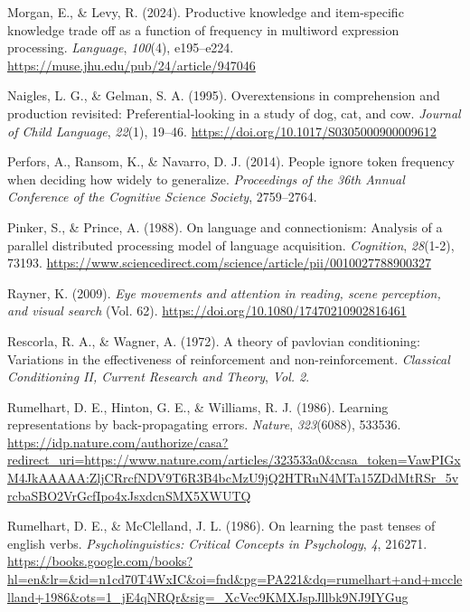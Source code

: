 \documentclass[
  letterpaper,
  DIV=11,
  numbers=noendperiod]{scrartcl}
\newlength{\cslhangindent}
\newenvironment{CSLReferences}[2] %
 {\begin{list}{}{%
  \setlength{\itemindent}{0pt}
  \setlength{\leftmargin}{0pt}
  \setlength{\parsep}{0pt}
  \ifodd #1
   \setlength{\leftmargin}{\cslhangindent}
   \setlength{\itemindent}{-1\cslhangindent}
  \fi
  \setlength{\itemsep}{#2\baselineskip}}}
 {\end{list}}
\begin{document}
\begin{CSLReferences}{1}{0}
Morgan, E., \& Levy, R. (2024). Productive knowledge and item-specific
knowledge trade off as a function of frequency in multiword expression
processing. \emph{Language}, \emph{100}(4), e195--e224.
\url{https://muse.jhu.edu/pub/24/article/947046}

Naigles, L. G., \& Gelman, S. A. (1995). Overextensions in comprehension
and production revisited: Preferential-looking in a study of dog, cat,
and cow. \emph{Journal of Child Language}, \emph{22}(1), 19--46.
\url{https://doi.org/10.1017/S0305000900009612}

Perfors, A., Ransom, K., \& Navarro, D. J. (2014). People ignore token
frequency when deciding how widely to generalize. \emph{Proceedings of
the 36th Annual Conference of the Cognitive Science Society},
2759--2764.

Pinker, S., \& Prince, A. (1988). On language and connectionism:
Analysis of a parallel distributed processing model of language
acquisition. \emph{Cognition}, \emph{28}(1-2), 73193.
\url{https://www.sciencedirect.com/science/article/pii/0010027788900327}

Rayner, K. (2009). \emph{Eye movements and attention in reading, scene
perception, and visual search} (Vol. 62).
\url{https://doi.org/10.1080/17470210902816461}

Rescorla, R. A., \& Wagner, A. (1972). A theory of pavlovian
conditioning: Variations in the effectiveness of reinforcement and
non-reinforcement. \emph{Classical Conditioning II, Current Research and
Theory}, \emph{Vol. 2}.

Rumelhart, D. E., Hinton, G. E., \& Williams, R. J. (1986). Learning
representations by back-propagating errors. \emph{Nature},
\emph{323}(6088), 533536.
\url{https://idp.nature.com/authorize/casa?redirect_uri=https://www.nature.com/articles/323533a0&casa_token=VawPIGxM4JkAAAAA:ZljCRrcfNDV9T6R3B4bcMzU9jQ2HTRuN4MTa15ZDdMtRSr_5vrcbaSBO2VrGcfIpo4xJsxdcnSMX5XWUTQ}

Rumelhart, D. E., \& McClelland, J. L. (1986). On learning the past
tenses of english verbs. \emph{Psycholinguistics: Critical Concepts in
Psychology}, \emph{4}, 216271.
\url{https://books.google.com/books?hl=en&lr=&id=n1cd70T4WxIC&oi=fnd&pg=PA221&dq=rumelhart+and+mcclelland+1986&ots=1_jE4qNRQr&sig=_XcVec9KMXJspJllbk9NJ9IYGug}


\end{CSLReferences}
\end{document}
